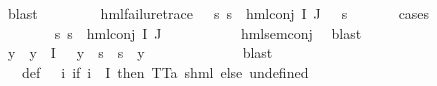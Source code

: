 \begin{isabellebody}
\ blast\isanewline
\ \ \ \ \isamarkupfalse%
\ \isamarkupfalse%
\ {\isachardoublequoteopen}{\isasymexists}{\isasympsi}{\isachardot}{\kern0pt}\ hml{\isacharunderscore}{\kern0pt}failure{\isacharunderscore}{\kern0pt}trace\ {\isasympsi}\ {\isasymand}\ {\isacharparenleft}{\kern0pt}{\isasymforall}s{\isachardot}{\kern0pt}\ {\isacharparenleft}{\kern0pt}s\ {\isasymTurnstile}\ hml{\isacharunderscore}{\kern0pt}conj\ I\ J\ {\isasymPhi}{\isacharparenright}{\kern0pt}\ {\isacharequal}{\kern0pt}\ {\isacharparenleft}{\kern0pt}s\ {\isasymTurnstile}\ {\isasympsi}{\isacharparenright}{\kern0pt}{\isacharparenright}{\kern0pt}{\isachardoublequoteclose}\isanewline
\ \ \ \ \isamarkupfalse%
{\isacharparenleft}{\kern0pt}cases{\isacharparenright}{\kern0pt}\isanewline
\ \ \ \ \ \ \isamarkupfalse%
\ {}\isanewline
\ \ \ \ \ \ \isamarkupfalse%
\ {\isachardoublequoteopen}{\isasymforall}s{\isachardot}{\kern0pt}\ {\isasymnot}s\ {\isasymTurnstile}\ {\isacharparenleft}{\kern0pt}hml{\isacharunderscore}{\kern0pt}conj\ I\ J\ {\isasymPhi}{\isacharparenright}{\kern0pt}{\isachardoublequoteclose}\isanewline
\ \ \ \ \ \ \ \ \isamarkupfalse%
\ hml{\isacharunderscore}{\kern0pt}sem{\isacharunderscore}{\kern0pt}conj\ \isamarkupfalse%
\ blast\isanewline
\ \ \ \ \ \ \isamarkupfalse%
\ y\ \ {\isachardoublequoteopen}y\ {\isasymin}\ {\isasymPhi}{\isacharbackquote}{\kern0pt}I{\isachardoublequoteclose}\ {\isachardoublequoteopen}{\isasymphi}\ {\isasymnoteq}\ y\ {\isasymand}\ {\isacharparenleft}{\kern0pt}{\isasymforall}s{\isachardot}{\kern0pt}\ {\isasymnot}\ s\ {\isasymTurnstile}\ y{\isacharparenright}{\kern0pt}{\isachardoublequoteclose}\ \isanewline
\ \ \ \ \ \ \ \ \isamarkupfalse%
\ {\isachardoublequoteopen}{}{\isachardoublequoteclose}\ \isamarkupfalse%
\ blast\isanewline
\ \ \ \ \ \ \isamarkupfalse%
\ {\isasymPsi}\ \ {\isasymPsi}{\isacharunderscore}{\kern0pt}def{\isacharcolon}{\kern0pt}\ {\isachardoublequoteopen}{\isasymPsi}\ {\isacharequal}{\kern0pt}\ {\isacharparenleft}{\kern0pt}{\isasymlambda}i{\isachardot}{\kern0pt}\ {\isacharparenleft}{\kern0pt}if\ i\ {\isasymin}\ I\ then\ {\isacharparenleft}{\kern0pt}TT{\isacharcolon}{\kern0pt}{\isacharcolon}{\kern0pt}{\isacharparenleft}{\kern0pt}{\isacharprime}{\kern0pt}a{\isacharcomma}{\kern0pt}\ {\isacharprime}{\kern0pt}s{\isacharparenright}{\kern0pt}hml{\isacharparenright}{\kern0pt}\ else\ undefined{\isacharparenright}{\kern0pt}{\isacharparenright}{\kern0pt}{\isachardoublequoteclose}\isanewline

\end{isabellebody}
